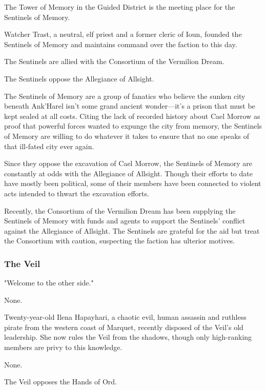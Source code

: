 \documentclass[10pt,a4paper,twoside,bg=print,twocolumn,openany,nodeprecatedcode]{dndbook}
\begin{document}
\begin{description}[nolistsep]
\item[Headquarters.]
The Tower of Memory in the Guided District is the meeting place for the Sentinels of Memory.
\item[Leader.]
Watcher Trast, a neutral, elf priest and a former cleric of Ioun, founded the Sentinels of Memory and maintains command over the faction to this day.
\item[Allies.]
The Sentinels are allied with the Consortium of the Vermilion Dream.
\item[Opponents.]
The Sentinels oppose the Allegiance of Allsight.
\end{description}

The Sentinels of Memory are a group of fanatics who believe the sunken city beneath Ank'Harel isn't some grand ancient wonder—it's a prison that must be kept sealed at all costs. Citing the lack of recorded history about Cael Morrow as proof that powerful forces wanted to expunge the city from memory, the Sentinels of Memory are willing to do whatever it takes to ensure that no one speaks of that ill-fated city ever again.

Since they oppose the excavation of Cael Morrow, the Sentinels of Memory are constantly at odds with the Allegiance of Allsight. Though their efforts to date have mostly been political, some of their members have been connected to violent acts intended to thwart the excavation efforts.

Recently, the Consortium of the Vermilion Dream has been supplying the Sentinels of Memory with funds and agents to support the Sentinels' conflict against the Allegiance of Allsight. The Sentinels are grateful for the aid but treat the Consortium with caution, suspecting the faction has ulterior motives.

\subsubsection{The Veil}
"Welcome to the other side."


\begin{description}[nolistsep]
\item[Headquarters.]
None.
\item[Leader.]
Twenty-year-old Ilena Hapayhari, a chaotic evil, human assassin and ruthless pirate from the western coast of Marquet, recently disposed of the Veil's old leadership. She now rules the Veil from the shadows, though only high-ranking members are privy to this knowledge.
\item[Allies.]
None.
\item[Opponents.]
The Veil opposes the Hands of Ord.
\end{description}
\end{document}
